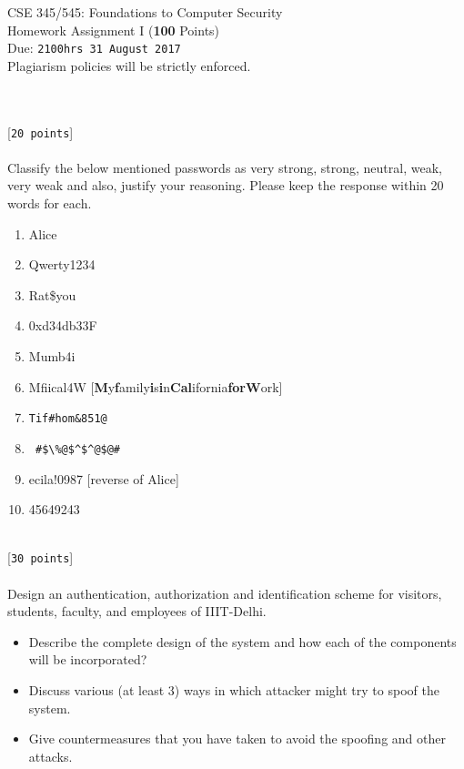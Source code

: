 \documentclass[11pt]{article}
\begin{document}
\begin{center}
\LARGE CSE 345/545: Foundations to Computer Security \\
\Large Homework Assignment I (\textbf{100} Points) \\
\Large Due: \texttt{2100hrs 31 August 2017} \\
Plagiarism policies will be strictly enforced. \\
\end{center}

\\
\\
 [\texttt{20 points}] \\\\
Classify the below mentioned passwords as very strong, strong, neutral, weak, very weak and also, justify your reasoning. Please keep the response within 20 words for each.
\begin{enumerate}
\item Alice
\item Qwerty1234
\item Rat\$you
\item 0xd34db33F
\item Mumb4i
\item Mfiical4W [\textbf{M}y\textbf{f}amily\textbf{i}s\textbf{i}n\textbf{Cal}ifornia\textbf{for}\textbf{W}ork]
\item \begin{verbatim}Tif#hom&851@ \end{verbatim} 
\item \begin{verbatim} #$\%@$^$^@$@#  \end{verbatim} 
\item ecila!0987 [reverse of Alice] 
\item 45649243 \\\\

\end{enumerate}

 [\texttt{30 points}] \\\\
Design an authentication, authorization and identification scheme for visitors, students, faculty, and employees of IIIT-Delhi.

\begin{itemize}
    \item Describe the complete design of the system and how each of the components will be incorporated?
    \item Discuss various (at least 3) ways in which attacker might try to spoof the system. 
    \item Give countermeasures that you have taken to avoid the spoofing and other attacks.
\end{itemize}
\end{document}
